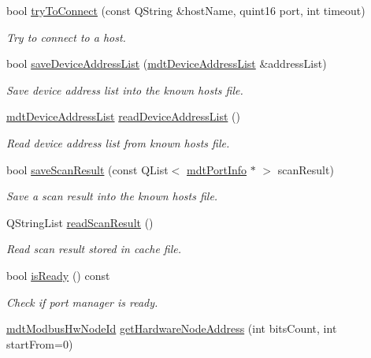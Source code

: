 \begin{DoxyCompactItemize}
bool \hyperlink{classmdt_modbus_tcp_port_manager_ab04f69b660487a7c59d309df7a8f5baa}{try\-To\-Connect} (const Q\-String \&host\-Name, quint16 port, int timeout)
\begin{DoxyCompactList}\small\item\em Try to connect to a host. \end{DoxyCompactList}\item 
bool \hyperlink{classmdt_modbus_tcp_port_manager_a1f8eb3874561f31e74a3355f4b1a6a8b}{save\-Device\-Address\-List} (\hyperlink{classmdt_device_address_list}{mdt\-Device\-Address\-List} \&address\-List)
\begin{DoxyCompactList}\small\item\em Save device address list into the known hosts file. \end{DoxyCompactList}\item 
\hyperlink{classmdt_device_address_list}{mdt\-Device\-Address\-List} \hyperlink{classmdt_modbus_tcp_port_manager_afe4db8318236242c3abd6752de2fcf38}{read\-Device\-Address\-List} ()
\begin{DoxyCompactList}\small\item\em Read device address list from known hosts file. \end{DoxyCompactList}\item 
bool \hyperlink{classmdt_modbus_tcp_port_manager_a3a1f5a54c93fa90ba83dea8785407da3}{save\-Scan\-Result} (const Q\-List$<$ \hyperlink{classmdt_port_info}{mdt\-Port\-Info} $\ast$ $>$ scan\-Result)
\begin{DoxyCompactList}\small\item\em Save a scan result into the known hosts file. \end{DoxyCompactList}\item 
Q\-String\-List \hyperlink{classmdt_modbus_tcp_port_manager_ab4d0a994973af6008faf489ca9ddb03d}{read\-Scan\-Result} ()
\begin{DoxyCompactList}\small\item\em Read scan result stored in cache file. \end{DoxyCompactList}\item 
bool \hyperlink{classmdt_modbus_tcp_port_manager_a5477eb7e8d57c5a42004046b426e39b6}{is\-Ready} () const 
\begin{DoxyCompactList}\small\item\em Check if port manager is ready. \end{DoxyCompactList}\item 
\hyperlink{classmdt_modbus_hw_node_id}{mdt\-Modbus\-Hw\-Node\-Id} \hyperlink{classmdt_modbus_tcp_port_manager_a02f498667f432c4430d1983e3dfd6055}{get\-Hardware\-Node\-Address} (int bits\-Count, int start\-From=0)

\end{DoxyCompactItemize}
